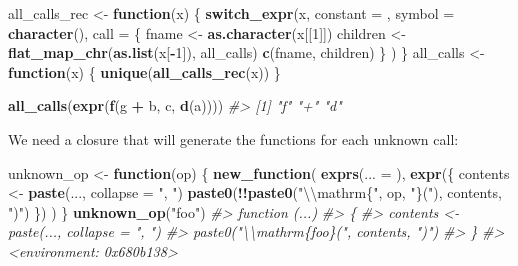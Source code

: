 \documentclass[]{book}
\newenvironment{Shaded}{\begin{snugshade}}{\end{snugshade}}
\newcommand{\CharTok}[1]{\textcolor[rgb]{0.5,0.5,0.5}{#1}}
\newcommand{\CommentTok}[1]{\textcolor[rgb]{0.37,0.37,0.37}{\textit{#1}}}
\newcommand{\ControlFlowTok}[1]{\textcolor[rgb]{0.27,0.27,0.27}{\textbf{#1}}}
\newcommand{\DataTypeTok}[1]{\textcolor[rgb]{0.27,0.27,0.27}{#1}}
\newcommand{\DecValTok}[1]{\textcolor[rgb]{0.06,0.06,0.06}{#1}}
\newcommand{\KeywordTok}[1]{\textcolor[rgb]{0.27,0.27,0.27}{\textbf{#1}}}
\newcommand{\NormalTok}[1]{#1}
\newcommand{\OperatorTok}[1]{\textcolor[rgb]{0.43,0.43,0.43}{\textbf{#1}}}
\newcommand{\StringTok}[1]{\textcolor[rgb]{0.5,0.5,0.5}{#1}}
\begin{document}
\begin{Shaded}
\begin{Highlighting}[]
\NormalTok{all_calls_rec <-}\StringTok{ }\ControlFlowTok{function}\NormalTok{(x) \{}
  \KeywordTok{switch_expr}\NormalTok{(x,}
    \DataTypeTok{constant =}\NormalTok{ ,}
    \DataTypeTok{symbol =}   \KeywordTok{character}\NormalTok{(),}
    \DataTypeTok{call =}\NormalTok{ \{}
\NormalTok{      fname <-}\StringTok{ }\KeywordTok{as.character}\NormalTok{(x[[}\DecValTok{1}\NormalTok{]])}
\NormalTok{      children <-}\StringTok{ }\KeywordTok{flat_map_chr}\NormalTok{(}\KeywordTok{as.list}\NormalTok{(x[}\OperatorTok{-}\DecValTok{1}\NormalTok{]), all_calls)}
      \KeywordTok{c}\NormalTok{(fname, children)}
\NormalTok{    \}}
\NormalTok{  )}
\NormalTok{\}}
\NormalTok{all_calls <-}\StringTok{ }\ControlFlowTok{function}\NormalTok{(x) \{}
  \KeywordTok{unique}\NormalTok{(}\KeywordTok{all_calls_rec}\NormalTok{(x))}
\NormalTok{\}}

\KeywordTok{all_calls}\NormalTok{(}\KeywordTok{expr}\NormalTok{(}\KeywordTok{f}\NormalTok{(g }\OperatorTok{+}\StringTok{ }\NormalTok{b, c, }\KeywordTok{d}\NormalTok{(a))))}
\CommentTok{#> [1] "f" "+" "d"}
\end{Highlighting}
\end{Shaded}

We need a closure that will generate the functions for each unknown call:

\begin{Shaded}
\begin{Highlighting}[]
\NormalTok{unknown_op <-}\StringTok{ }\ControlFlowTok{function}\NormalTok{(op) \{}
  \KeywordTok{new_function}\NormalTok{(}
    \KeywordTok{exprs}\NormalTok{(}\DataTypeTok{... =}\NormalTok{ ),}
    \KeywordTok{expr}\NormalTok{(\{}
\NormalTok{      contents <-}\StringTok{ }\KeywordTok{paste}\NormalTok{(..., }\DataTypeTok{collapse =} \StringTok{", "}\NormalTok{)}
      \KeywordTok{paste0}\NormalTok{(}\OperatorTok{!!}\KeywordTok{paste0}\NormalTok{(}\StringTok{"}\CharTok{\textbackslash{}\textbackslash{}}\StringTok{mathrm\{"}\NormalTok{, op, }\StringTok{"\}("}\NormalTok{), contents, }\StringTok{")"}\NormalTok{)}
\NormalTok{    \})}
\NormalTok{  )}
\NormalTok{\}}
\KeywordTok{unknown_op}\NormalTok{(}\StringTok{"foo"}\NormalTok{)}
\CommentTok{#> function (...) }
\CommentTok{#> \{}
\CommentTok{#>     contents <- paste(..., collapse = ", ")}
\CommentTok{#>     paste0("\textbackslash{}\textbackslash{}mathrm\{foo\}(", contents, ")")}
\CommentTok{#> \}}
\CommentTok{#> <environment: 0x680b138>}
\end{Highlighting}
\end{Shaded}
\end{document}
